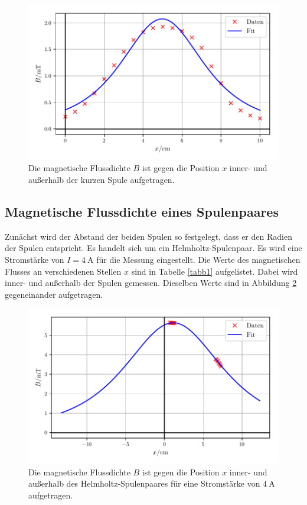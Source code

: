 \begin{figure}
    \centering
    \includegraphics{build/plota2.pdf}
    \caption{Die magnetische Flussdichte $B$ ist gegen die Position $x$ inner-
    und außerhalb der kurzen Spule aufgetragen.}
    \label{plota2}
\end{figure}

\noindent 

\subsection{Magnetische Flussdichte eines Spulenpaares}
Zunächst wird der Abstand der beiden Spulen so festgelegt, dass
er den Radien der Spulen entspricht. Es handelt sich um ein
Helmholtz-Spulenpaar.
Es wird eine Stromstärke von $I = \SI{4}{\ampere}$ für die
Messung eingestellt.
Die Werte des magnetischen Flusses an verschiedenen Stellen
$x$ sind in Tabelle \ref{tabb1} aufgelistet. Dabei wird inner-
und außerhalb der Spulen gemessen.
Dieselben Werte sind in Abbildung \ref{plotb1} gegeneinander
aufgetragen.


\begin{figure}
    \centering
    \includegraphics{build/plotb1.pdf}
    \caption{Die magnetische Flussdichte $B$ ist gegen die Position $x$ inner-
    und außerhalb des Helmholtz-Spulenpaares für eine Stromstärke von
    $\SI{4}{\ampere}$ aufgetragen.}
    \label{plotb1}
\end{figure}

